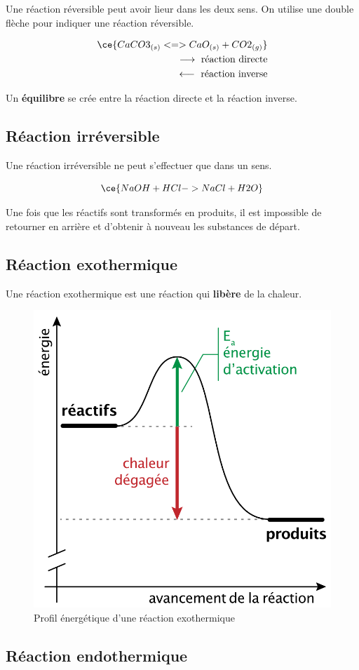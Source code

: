 \documentclass[
  11pt,
  a4paper,
  openany]{book}
\begin{document}
Une réaction réversible peut avoir lieur dans les deux sens. On utilise une double flèche pour indiquer une réaction réversible.

\[ \begin{split}
  \ce{ CaCO3_{(s)} <=> CaO_{(s)} + CO2_{(g)} } \\
    \longrightarrow \text{ réaction directe} \\
    \longleftarrow \text{ réaction inverse}
    \end{split} \]

Un \textbf{équilibre} se crée entre la réaction directe et la réaction inverse.

\subsection{Réaction irréversible}\label{ruxe9action-irruxe9versible}

Une réaction irréversible ne peut s'effectuer que dans un sens.

\[ \ce{ NaOH + HCl -> NaCl + H2O } \]

Une fois que les réactifs sont transformés en produits, il est impossible de retourner en arrière et d'obtenir à nouveau les substances de départ.

\subsection{Réaction exothermique}\label{ruxe9action-exothermique}

Une réaction exothermique est une réaction qui \textbf{libère} de la chaleur.

\begin{figure}

{\centering \includegraphics[width=0.33\linewidth]{images/chaleur-1} 

}

\caption{Profil énergétique d'une réaction exothermique}\label{fig:chaleur-1}
\end{figure}

\subsection{Réaction endothermique}\label{ruxe9action-endothermique}
\end{document}

